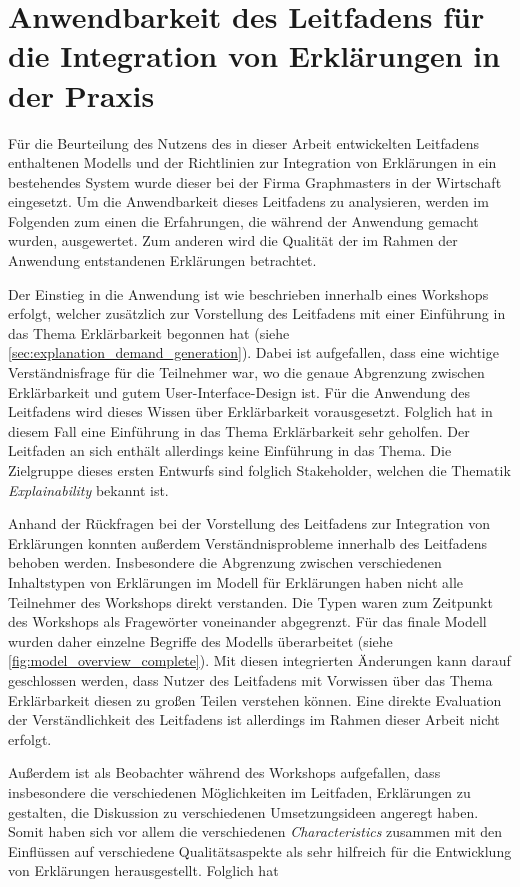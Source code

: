 \section{Anwendbarkeit des Leitfadens für die Integration von Erklärungen in der Praxis}

Für die Beurteilung des Nutzens des in dieser Arbeit entwickelten Leitfadens enthaltenen Modells und der Richtlinien zur Integration von Erklärungen in ein bestehendes System wurde dieser bei der Firma Graphmasters in der Wirtschaft eingesetzt. Um die Anwendbarkeit dieses Leitfadens zu analysieren, werden im Folgenden zum einen die Erfahrungen, die während der Anwendung gemacht wurden, ausgewertet. Zum anderen wird die Qualität der im Rahmen der Anwendung entstandenen Erklärungen betrachtet.

Der Einstieg in die Anwendung ist wie beschrieben innerhalb eines Workshops erfolgt, welcher zusätzlich zur Vorstellung des Leitfadens mit einer Einführung in das Thema Erklärbarkeit begonnen hat (siehe \autoref{sec:explanation_demand_generation}). Dabei ist aufgefallen, dass eine wichtige Verständnisfrage für die Teilnehmer war, wo die genaue Abgrenzung zwischen Erklärbarkeit und gutem User-Interface-Design ist. Für die Anwendung des Leitfadens wird dieses Wissen über Erklärbarkeit vorausgesetzt. Folglich hat in diesem Fall eine Einführung in das Thema Erklärbarkeit sehr geholfen. Der Leitfaden an sich enthält allerdings keine Einführung in das Thema. Die Zielgruppe dieses ersten Entwurfs sind folglich Stakeholder, welchen die Thematik \textit{Explainability} bekannt ist.

Anhand der Rückfragen bei der Vorstellung des Leitfadens zur Integration von Erklärungen konnten außerdem Verständnisprobleme innerhalb des Leitfadens behoben werden. Insbesondere die Abgrenzung zwischen verschiedenen Inhaltstypen von Erklärungen im Modell für Erklärungen haben nicht alle Teilnehmer des Workshops direkt verstanden. Die Typen waren zum Zeitpunkt des Workshops als Fragewörter voneinander abgegrenzt. Für das finale Modell wurden daher einzelne Begriffe des Modells überarbeitet (siehe \autoref{fig:model_overview_complete}). Mit diesen integrierten Änderungen kann darauf geschlossen werden, dass Nutzer des Leitfadens mit Vorwissen über das Thema Erklärbarkeit diesen zu großen Teilen verstehen können. Eine direkte Evaluation der Verständlichkeit des Leitfadens ist allerdings im Rahmen dieser Arbeit nicht erfolgt.

Außerdem ist als Beobachter während des Workshops aufgefallen, dass insbesondere die verschiedenen Möglichkeiten im Leitfaden, Erklärungen zu gestalten, die Diskussion zu verschiedenen Umsetzungsideen angeregt haben. Somit haben sich vor allem die verschiedenen \textit{Characteristics} zusammen mit den Einflüssen auf verschiedene Qualitätsaspekte als sehr hilfreich für die Entwicklung von Erklärungen herausgestellt. Folglich hat 

